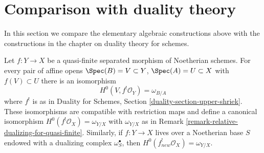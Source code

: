 \section{Comparison with duality theory}
\label{section-comparison}

\noindent
In this section we compare the elementary algebraic constructions
above with the constructions in the chapter on duality theory
for schemes.

\begin{lemma}
\label{lemma-compare-dualizing}
Let $f : Y \to X$ be a quasi-finite separated morphism of Noetherian schemes.
For every pair of affine opens $\Spec(B) = V \subset Y$,
$\Spec(A) = U \subset X$ with $f(V) \subset U$ there is an isomorphism
$$
H^0(V, f^!\mathcal{O}_Y) = \omega_{B/A}
$$
where $f^!$ is as in
Duality for Schemes, Section \ref{duality-section-upper-shriek}.
These isomorphisms are compatible with restriction maps and define a canonical
isomorphism $H^0(f^!\mathcal{O}_X) = \omega_{Y/X}$ with
$\omega_{Y/X}$ as in Remark \ref{remark-relative-dualizing-for-quasi-finite}.
Similarly, if $f : Y \to X$ lives over a Noetherian base $S$
endowed with a dualizing complex $\omega_S^\bullet$, then
$H^0(f_{new}^!\mathcal{O}_X) = \omega_{Y/X}$.
\end{lemma}

